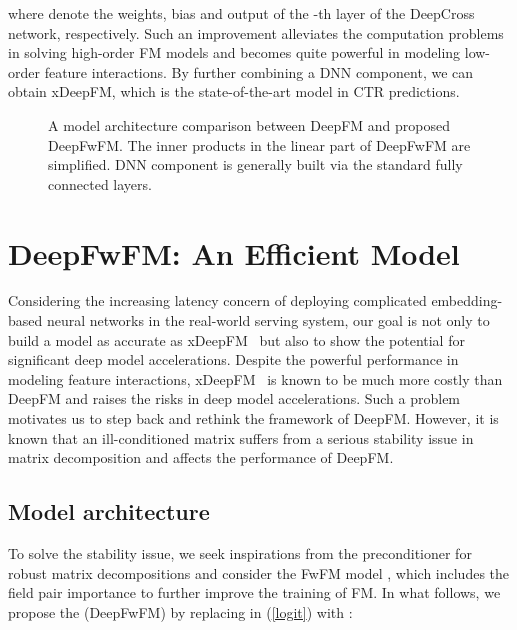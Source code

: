 \documentclass[sigconf]{acmart}
\begin{document}
where  denote the weights, bias and output of the -th layer of the DeepCross network, respectively. Such an improvement alleviates the computation problems in solving high-order FM models and becomes quite powerful in modeling low-order feature interactions. By further combining a DNN component, we can obtain xDeepFM\citep{xdeepfm}, which is the state-of-the-art model in CTR predictions.


\begin{figure*}[h!]
\centering
  \label{fig:2a}\qquad
  \label{fig:2b}
  \caption{A model architecture comparison between DeepFM and proposed DeepFwFM. The inner products in the linear part of DeepFwFM are simplified. DNN component is generally built via the standard fully connected layers.}
  \label{deepFM}
\end{figure*}


\section{DeepFwFM: An Efficient Model}

Considering the increasing latency concern of deploying complicated embedding-based neural networks in the real-world serving system, our goal is not only to build a model as accurate as xDeepFM~\cite{xdeepfm} but also to show the potential for significant deep model accelerations. Despite the powerful performance in modeling feature interactions, xDeepFM~\cite{xdeepfm} is known to be much more costly than DeepFM \citep{xdeepfm, autocross} and raises the risks in deep model accelerations. Such a problem motivates us to step back and rethink the framework of DeepFM. However, it is known that an ill-conditioned matrix suffers from a serious stability issue in matrix decomposition \citep{Michael_Jordan15, Li16} and affects the performance of DeepFM. 


\subsection{Model architecture}

To solve the stability issue, we seek inspirations from the preconditioner for robust matrix decompositions and consider the FwFM model \citep{fwfm}, which includes the field pair importance to further improve the training of FM. In what follows, we propose the     (DeepFwFM) by replacing  in (\ref{logit}) with :
\end{document}
